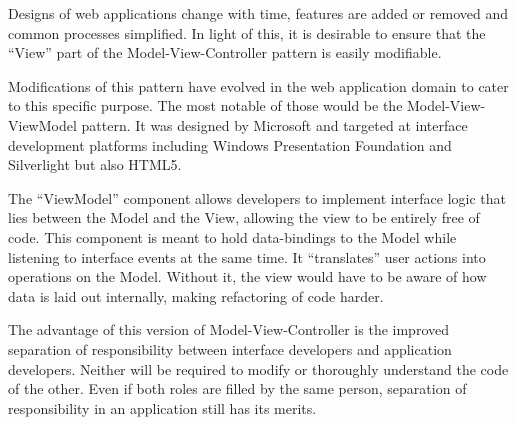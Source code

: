 \documentclass[thesis.tex]{subfiles}
\begin{document}
Designs of web applications change with time, features are added or
removed and common processes simplified. In light of this, it is
desirable to ensure that the ``View'' part of the Model-View-Controller
pattern is easily modifiable.

Modifications of this pattern have evolved in the web application domain to
cater to this specific purpose. The most notable of those would be the
Model-View-ViewModel pattern. It was designed by Microsoft and targeted at
interface development platforms including Windows Presentation Foundation and
Silverlight but also HTML5.

The ``ViewModel'' component allows developers to implement interface logic that
lies between the Model and the View, allowing the view to be entirely free
of code. This component is meant to hold data-bindings to the Model while
listening to interface events at the same time. It ``translates'' user actions
into operations on the Model. Without it, the view would have to be aware of how
data is laid out internally, making refactoring of code harder.

The advantage of this version of Model-View-Controller is the improved
separation of responsibility between interface developers and application
developers. Neither will be required to modify or thoroughly understand the code
of the other. Even if both roles are filled by the same person,
separation of responsibility in an application still has its merits.
\end{document}

